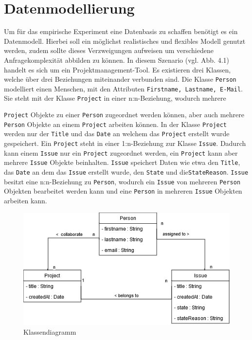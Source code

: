 \chapter{Datenmodellierung} %
\label{sec:datamodelling}
Um für das empirische Experiment eine Datenbasis zu schaffen benötigt es ein Datenmodell. Hierbei soll ein möglichst realistisches und flexibles Modell genutzt werden, zudem sollte dieses Verzweigungen aufweisen um verschiedene Anfragekomplexität abbilden zu können. In diesem Szenario (vgl. Abb. 4.1) handelt es sich um ein Projektmanagement-Tool. Es existieren drei Klassen, welche über drei Beziehungen miteinander verbunden sind. Die Klasse \texttt{Person} modelliert einen Menschen, mit den Attributen \texttt{Firstname, Lastname, E-Mail}. Sie steht mit der Klasse \texttt{Project} in einer n:n-Beziehung, wodurch mehrere 

\noindent
\texttt{Project} Objekte zu einer \texttt{Person} zugeordnet werden können, aber auch mehrere \texttt{Person} Objekte an einem \texttt{Project} arbeiten können. In der Klasse \texttt{Project} werden nur der \texttt{Title} und das \texttt{Date} an welchem das \texttt{Project} erstellt wurde gespeichert. Ein \texttt{Project} steht in einer 1:n-Beziehung zur Klasse \texttt{Issue}. Dadurch kann einem \texttt{Issue} nur ein \texttt{Project} zugeordnet werden, ein \texttt{Project} kann aber mehrere \texttt{Issue} Objekte beinhalten. \texttt{Issue} speichert Daten wie etwa den \texttt{Title}, das \texttt{Date} an dem das \texttt{Issue} erstellt wurde, den \texttt{State} und die\texttt{StateReason}. \texttt{Issue} besitzt eine n:n-Beziehung zu \texttt{Person}, wodurch ein \texttt{Issue} von mehreren \texttt{Person} Objekten bearbeitet werden kann und eine \texttt{Person} in mehreren \texttt{Issue} Objekten arbeiten kann.
\vspace{1cm}
\label{sec:datenmodell}
\begin{figure}[h!]
	\centering
	\includegraphics[scale=.8]{Illustrations/class_diagram.png}
	\caption{Klassendiagramm}
\end{figure}



